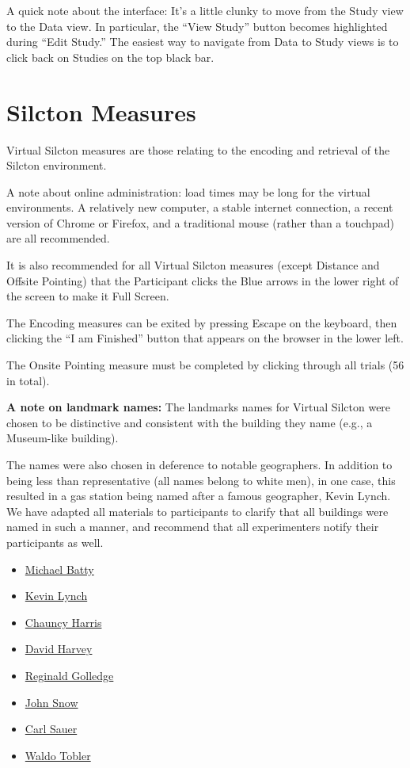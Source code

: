 \documentclass[
  12pt,
]{book}
\begin{document}
A quick note about the interface: It's a little clunky to move from the Study view to the Data view. In particular, the ``View Study'' button becomes highlighted during ``Edit Study.'' The easiest way to navigate from Data to Study views is to click back on Studies on the top black bar.

\hypertarget{silcton-measures}{%
\chapter{Silcton Measures}\label{silcton-measures}}

Virtual Silcton measures are those relating to the encoding and retrieval of the Silcton environment.

A note about online administration: load times may be long for the virtual environments. A relatively new computer, a stable internet connection, a recent version of Chrome or Firefox, and a traditional mouse (rather than a touchpad) are all recommended.

It is also recommended for all Virtual Silcton measures (except Distance and Offsite Pointing) that the Participant clicks the Blue arrows in the lower right of the screen to make it Full Screen.

The Encoding measures can be exited by pressing Escape on the keyboard, then clicking the ``I am Finished'' button that appears on the browser in the lower left.

The Onsite Pointing measure must be completed by clicking through all trials (56 in total).

\textbf{A note on landmark names:}
The landmarks names for Virtual Silcton were chosen to be distinctive and consistent with the building they name (e.g., a Museum-like building).

The names were also chosen in deference to notable geographers. In addition to being less than representative (all names belong to white men), in one case, this resulted in a gas station being named after a famous geographer, Kevin Lynch. We have adapted all materials to participants to clarify that all buildings were named in such a manner, and recommend that all experimenters notify their participants as well.

\begin{itemize}
\item
  \href{https://en.wikipedia.org/wiki/Michael_Batty}{Michael Batty}
\item
  \href{https://en.wikipedia.org/wiki/Kevin_A._Lynch}{Kevin Lynch}
\item
  \href{https://en.wikipedia.org/wiki/Chauncy_Harris}{Chauncy Harris}
\item
  \href{https://en.wikipedia.org/wiki/David_Harvey}{David Harvey}
\item
  \href{https://en.wikipedia.org/wiki/Reginald_Golledge}{Reginald Golledge}
\item
  \href{https://en.wikipedia.org/wiki/John_Snow}{John Snow}
\item
  \href{https://en.wikipedia.org/wiki/Carl_O._Sauer}{Carl Sauer}
\item
  \href{https://en.wikipedia.org/wiki/Waldo_R._Tobler}{Waldo Tobler}
\end{itemize}
\end{document}
